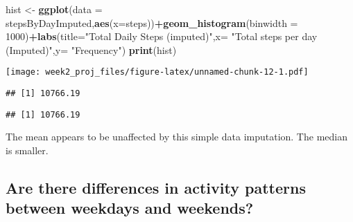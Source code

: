 \documentclass[]{article}
\newenvironment{Shaded}{\begin{snugshade}}{\end{snugshade}}
\newcommand{\KeywordTok}[1]{\textcolor[rgb]{0.13,0.29,0.53}{\textbf{#1}}}
\newcommand{\DataTypeTok}[1]{\textcolor[rgb]{0.13,0.29,0.53}{#1}}
\newcommand{\DecValTok}[1]{\textcolor[rgb]{0.00,0.00,0.81}{#1}}
\newcommand{\StringTok}[1]{\textcolor[rgb]{0.31,0.60,0.02}{#1}}
\newcommand{\OperatorTok}[1]{\textcolor[rgb]{0.81,0.36,0.00}{\textbf{#1}}}
\newcommand{\NormalTok}[1]{#1}
\begin{document}
\begin{Shaded}
\begin{Highlighting}[]
\NormalTok{hist <-}\StringTok{ }\KeywordTok{ggplot}\NormalTok{(}\DataTypeTok{data =}\NormalTok{ stepsByDayImputed,}\KeywordTok{aes}\NormalTok{(}\DataTypeTok{x=}\NormalTok{steps))}\OperatorTok{+}\KeywordTok{geom_histogram}\NormalTok{(}\DataTypeTok{binwidth =} \DecValTok{1000}\NormalTok{)}\OperatorTok{+}\KeywordTok{labs}\NormalTok{(}\DataTypeTok{title=}\StringTok{"Total Daily Steps (imputed)"}\NormalTok{,}\DataTypeTok{x=} \StringTok{"Total steps per day (Imputed)"}\NormalTok{,}\DataTypeTok{y=} \StringTok{"Frequency"}\NormalTok{)}
\KeywordTok{print}\NormalTok{(hist)}
\end{Highlighting}
\end{Shaded}

\texttt{[image: week2\_proj\_files/figure-latex/unnamed-chunk-12-1.pdf]}

\begin{Shaded}
\end{Shaded}

\begin{verbatim}
## [1] 10766.19
\end{verbatim}

\begin{Shaded}
\end{Shaded}

\begin{verbatim}
## [1] 10766.19
\end{verbatim}

The mean appears to be unaffected by this simple data imputation. The
median is smaller.

\subsection{Are there differences in activity patterns between weekdays
and
weekends?}\label{are-there-differences-in-activity-patterns-between-weekdays-and-weekends}
\end{document}
